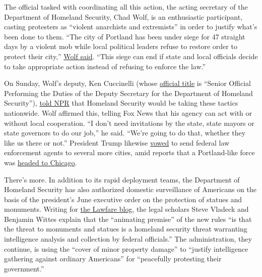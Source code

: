 The official tasked with coordinating all this action, the acting
secretary of the Department of Homeland Security, Chad Wolf, is an
enthusiastic participant, casting protesters as ``violent anarchists and
extremists'' in order to justify what's been done to them. ``The city of
Portland has been under siege for 47 straight days by a violent mob
while local political leaders refuse to restore order to protect their
city,''
\href{https://www.dhs.gov/news/2020/07/16/acting-secretary-wolf-condemns-rampant-long-lasting-violence-portland}{Wolf
said}. ``This siege can end if state and local officials decide to take
appropriate action instead of refusing to enforce the law.''

On Sunday, Wolf's deputy, Ken Cuccinelli (whose
\href{https://www.uscis.gov/about-us/leadership/kenneth-t-ken-cuccinelli-senior-official-performing-the-duties-of-the-director-us-citizenship-and\#:~:text=\%3B\%20Director\%20(vacant)-,Kenneth\%20T.,Mr.}{official
title} is ``Senior Official Performing the Duties of the Deputy
Secretary for the Department of Homeland Security''),
\href{https://talkingpointsmemo.com/edblog/dhs-under-boss-were-taking-this-national}{told
NPR} that Homeland Security would be taking these tactics nationwide.
Wolf affirmed this, telling Fox News that his agency can act with or
without local cooperation. ``I don't need invitations by the state,
state mayors or state governors to do our job,'' he said. ``We're going
to do that, whether they like us there or not.'' President Trump
likewise
\href{https://www.foxnews.com/politics/trump-vows-to-send-federal-agents-dhs-chicago}{vowed}
to send federal law enforcement agents to several more cities, amid
reports that a Portland-like force was
\href{https://www.chicagotribune.com/news/criminal-justice/ct-chicago-police-dhs-deployment-20200720-dftu5ychwbcxtg4ltarh5qnwma-story.html}{headed
to Chicago}.

There's more. In addition to its rapid deployment teams, the Department
of Homeland Security has also authorized domestic surveillance of
Americans on the basis of the president's June executive order on the
protection of statues and monuments. Writing for
\href{https://www.lawfareblog.com/dhs-authorizes-domestic-surveillance-protect-statues-and-monuments}{the
Lawfare blog}, the legal scholars Steve Vladeck and Benjamin Wittes
explain that the ``animating premise'' of the new rules ``is that the
threat to monuments and statues is a homeland security threat warranting
intelligence analysis and collection by federal officials.'' The
administration, they continue, is using the ``cover of minor property
damage'' to ``justify intelligence gathering against ordinary
Americans'' for ``peacefully protesting their government.''

